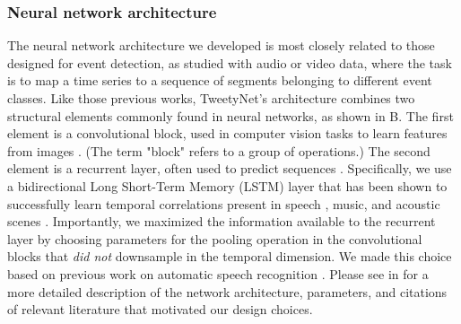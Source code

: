 \documentclass[9pt,lineno]{elife}
\begin{document}
\begin{figure}[!ht]
{%
}
\label{fig:tweetynet_architecture}
\end{figure} %

\subsubsection{Neural network architecture}
The neural network architecture we developed is most closely related 
to those designed for event detection, 
as studied with audio \citep{bock_polyphonic_2012-1,parascandolo_recurrent_2016} 
or video \citep{lea2017temporal} data,  
where the task is to map a time series to a sequence of segments belonging to different event classes. 
Like those previous works, TweetyNet's architecture combines two structural elements  
commonly found in neural networks, as shown in B.
The first element is a convolutional block, 
used in computer vision tasks to learn features from images \citep{goodfellow_deep_2016,farabet_learning_2013,krizhevsky_imagenet_2012}.
(The term "block" refers to a group of operations.)
The second element is a recurrent layer, 
often used to predict sequences \citep{graves_supervised_2012}. 
Specifically, we use a bidirectional Long Short-Term Memory (LSTM) layer 
that has been shown to successfully learn temporal correlations present in speech \citep{graves_supervised_2012}, 
music, and acoustic scenes 
\citep{bock_polyphonic_2012-1,parascandolo_recurrent_2016}. 
Importantly, we maximized the information available to the recurrent layer  
by choosing parameters for the pooling operation in the convolutional blocks  
that \textit{did not} downsample in the temporal dimension. 
We made this choice based on previous work on automatic speech recognition
\citep{sainath2013deep, sainath2013improvements}.
Please see  in  
for a more detailed description of the 
network architecture, parameters, and citations of relevant literature 
that motivated our design choices.
\end{document}
